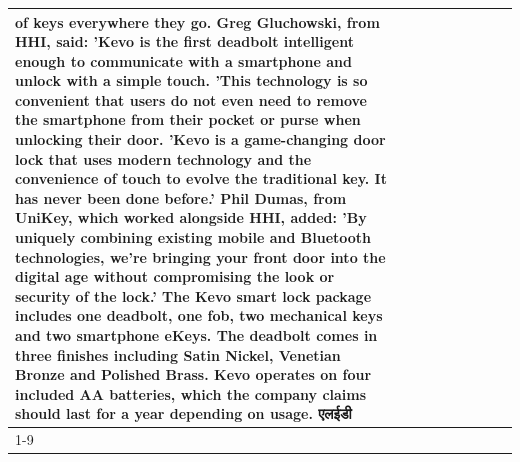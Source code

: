 \begin{table}[H]
\begin{tabular}{lllrlllll}
of keys everywhere they go. Greg Gluchowski, from HHI, said: 'Kevo is the first deadbolt intelligent enough to communicate with a smartphone and unlock with a simple touch. 'This technology is so convenient that users do not even need to remove the smartphone from their pocket or purse when unlocking their door. 'Kevo is a game-changing door lock that uses modern technology and the convenience of touch to evolve the traditional key. It has never been done before.' Phil Dumas, from UniKey, which worked alongside HHI, added: 'By uniquely combining existing mobile and Bluetooth technologies, we’re bringing your front door into the digital age without compromising the look or security of the lock.' The Kevo smart lock package includes one deadbolt, one fob, two mechanical keys and two smartphone eKeys. The deadbolt comes in three finishes including Satin Nickel, Venetian Bronze and Polished Brass. Kevo operates on four included AA batteries, which the company claims should last for a year depending on usage. एलईडी \\
\cline{1-9}

\end{tabular}
\end{table}
